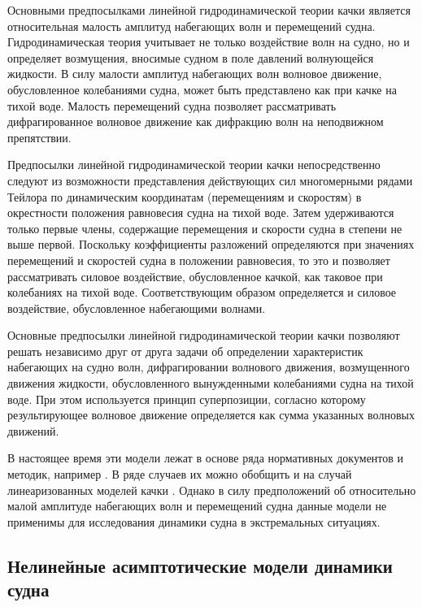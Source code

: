 Основными предпосылками линейной гидродинамической теории качки является относительная малость амплитуд набегающих волн и перемещений судна. Гидродинамическая теория учитывает не только воздействие волн на судно, но и определяет возмущения, вносимые судном в поле давлений волнующейся жидкости. В силу малости амплитуд набегающих волн волновое движение, обусловленное колебаниями судна, может быть представлено как при качке на тихой воде. Малость перемещений судна позволяет рассматривать дифрагированное волновое движение как дифракцию волн на неподвижном препятствии.

Предпосылки линейной гидродинамической теории качки непосредственно следуют из возможности представления действующих сил многомерными рядами Тейлора по динамическим координатам (перемещениям и скоростям) в окрестности положения равновесия судна на тихой воде. Затем удерживаются только первые члены, содержащие перемещения и скорости судна в степени не выше первой. Поскольку коэффициенты разложений определяются при значениях перемещений и скоростей судна в положении равновесия, то это и позволяет рассматривать силовое воздействие, обусловленное качкой, как таковое при колебаниях на тихой воде. Соответствующим образом определяется и силовое воздействие, обусловленное набегающими волнами.

Основные предпосылки линейной гидродинамической теории качки позволяют решать независимо друг от друга задачи об определении характеристик набегающих на судно волн, дифрагировании волнового движения, возмущенного движения жидкости, обусловленного вынужденными колебаниями судна на тихой воде. При этом используется принцип суперпозиции, согласно которому результирующее волновое движение определяется как сумма указанных волновых движений. 

В настоящее время эти модели лежат в основе ряда нормативных документов и методик, например \citep{dk14}\citep{dk15}. В ряде случаев их можно обобщить и на случай линеаризованных моделей качки \citep{dk1}. Однако в силу предположений об относительно малой амплитуде набегающих волн и перемещений судна данные модели не применимы для исследования динамики судна в экстремальных ситуациях.


\subsection{Нелинейные асимптотические модели динамики судна}

